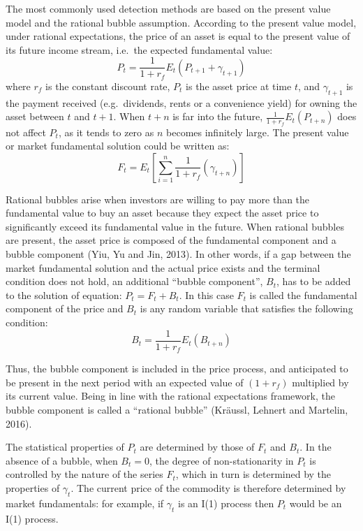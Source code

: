 \documentclass[12pt,]{article}
\begin{document}
The most commonly used detection methods are based on the present value
model and the rational bubble assumption. According to the present value
model, under rational expectations, the price of an asset is equal to
the present value of its future income stream, i.e.~the expected
fundamental value: \[P_t = \frac{1}{1+r_f} E_t(P_{t+1} + \gamma_{t+1})\]
where \(r_f\) is the constant discount rate, \(P_t\) is the asset price
at time \(t\), and \(\gamma_{t+1}\) is the payment received
(e.g.~dividends, rents or a convenience yield) for owning the asset
between \(t\) and \(t+1\). When \(t+n\) is far into the future,
\(\frac{1}{1+r_f} E_t(P_{t+n})\) does not affect \(P_t\), as it tends to
zero as \(n\) becomes infinitely large. The present value or market
fundamental solution could be written as:
\[F_t = E_t[\sum_{i=1}^n \frac{1}{1+r_f} (\gamma_{t+n})]\]

Rational bubbles arise when investors are willing to pay more than the
fundamental value to buy an asset because they expect the asset price to
significantly exceed its fundamental value in the future. When rational
bubbles are present, the asset price is composed of the fundamental
component and a bubble component (Yiu, Yu and Jin, 2013). In other
words, if a gap between the market fundamental solution and the actual
price exists and the terminal condition does not hold, an additional
``bubble component'', \(B_t\), has to be added to the solution of
equation: \(P_t = F_t + B_t\). In this case \(F_t\) is called the
fundamental component of the price and \(B_t\) is any random variable
that satisfies the following condition:
\[B_t = \frac{1}{1+r_f} E_t(B_{t+n})\]

Thus, the bubble component is included in the price process, and
anticipated to be present in the next period with an expected value of
\((1 + r_f)\) multiplied by its current value. Being in line with the
rational expectations framework, the bubble component is called a
``rational bubble'' (Kräussl, Lehnert and Martelin, 2016).

The statistical properties of \(P_t\) are determined by those of \(F_t\)
and \(B_t\). In the absence of a bubble, when \(B_t=0\), the degree of
non-stationarity in \(P_t\) is controlled by the nature of the series
\(F_t\), which in turn is determined by the properties of \(\gamma_t\).
The current price of the commodity is therefore determined by market
fundamentals: for example, if \(\gamma_t\) is an I(1) process then
\(P_t\) would be an I(1) process.
\end{document}
